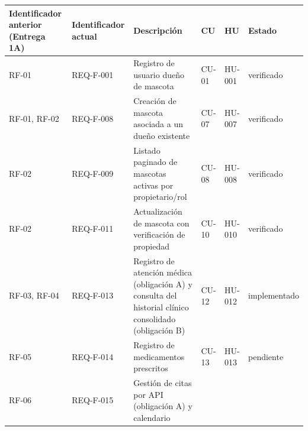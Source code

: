 \documentclass[
  spanish,
]{article}
\newcounter{none} %
\begin{document}
{\def\LTcaptype{none} %
\begin{longtable}[]{@{}
  >{\raggedright\arraybackslash}p{}
  >{\raggedright\arraybackslash}p{}
  >{\raggedright\arraybackslash}p{}
  >{\raggedright\arraybackslash}p{}
  >{\raggedright\arraybackslash}p{}
  >{\raggedright\arraybackslash}p{}@{}}
\toprule\noalign{}
\begin{minipage}[b]{\linewidth}\raggedright
Identificador anterior (Entrega 1A)
\end{minipage} & \begin{minipage}[b]{\linewidth}\raggedright
Identificador actual
\end{minipage} & \begin{minipage}[b]{\linewidth}\raggedright
Descripción
\end{minipage} & \begin{minipage}[b]{\linewidth}\raggedright
CU
\end{minipage} & \begin{minipage}[b]{\linewidth}\raggedright
HU
\end{minipage} & \begin{minipage}[b]{\linewidth}\raggedright
Estado
\end{minipage} \\
\midrule\noalign{}
\endhead
\bottomrule\noalign{}
\endlastfoot
RF-01 & REQ-F-001 & Registro de usuario dueño de mascota & CU-01 &
HU-001 & verificado \\
RF-01, RF-02 & REQ-F-008 & Creación de mascota asociada a un dueño
existente & CU-07 & HU-007 & verificado \\
RF-02 & REQ-F-009 & Listado paginado de mascotas activas por
propietario/rol & CU-08 & HU-008 & verificado \\
RF-02 & REQ-F-011 & Actualización de mascota con verificación de
propiedad & CU-10 & HU-010 & verificado \\
RF-03, RF-04 & REQ-F-013 & Registro de atención médica (obligación A) y
consulta del historial clínico consolidado (obligación B) & CU-12 &
HU-012 & implementado \\
RF-05 & REQ-F-014 & Registro de medicamentos prescritos & CU-13 & HU-013
& pendiente \\
RF-06 & REQ-F-015 & Gestión de citas por API (obligación A) y calendario

\end{longtable}}
\end{document}
